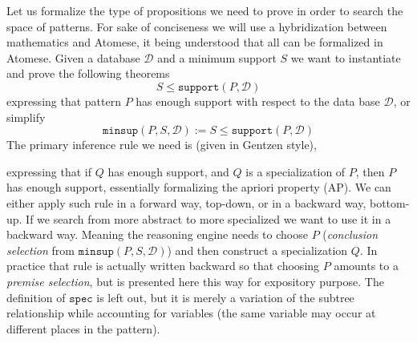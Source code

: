 \documentclass[runningheads]{llncs}
\begin{document}
Let us formalize the type of propositions we need to prove in order to
search the space of patterns. For sake of conciseness we will use a
hybridization between mathematics and Atomese, it being understood that
all can be formalized in Atomese.  Given a database $\mathcal{D}$ and
a minimum support $S$ we want to instantiate and prove the following
theorems
$$ S \le \texttt{support}(P, \mathcal{D}) $$ expressing that pattern
$P$ has enough support with respect to the data base $\mathcal{D}$, or
simplify
$$ \texttt{minsup}(P, S, \mathcal{D}) := S \le \texttt{support}(P,
\mathcal{D}) $$ The primary inference rule we need is (given in
Gentzen style),
\begin{prooftree}
\end{prooftree}
expressing that if $Q$ has enough support, and $Q$ is a specialization
of $P$, then $P$ has enough support, essentially formalizing the
apriori property (AP). We can either apply such rule in a forward way,
top-down, or in a backward way, bottom-up. If we search from more
abstract to more specialized we want to use it in a backward
way. Meaning the reasoning engine needs to choose $P$
(\emph{conclusion selection} from $\texttt{minsup}(P, S,
\mathcal{D})$) and then construct a specialization $Q$.  In practice
that rule is actually written backward so that choosing $P$ amounts to
a \emph{premise selection}, but is presented here this way for
expository purpose.  The definition of $\texttt{spec}$ is left out,
but it is merely a variation of the subtree relationship while
accounting for variables (the same variable may occur at different
places in the pattern).
\end{document}
